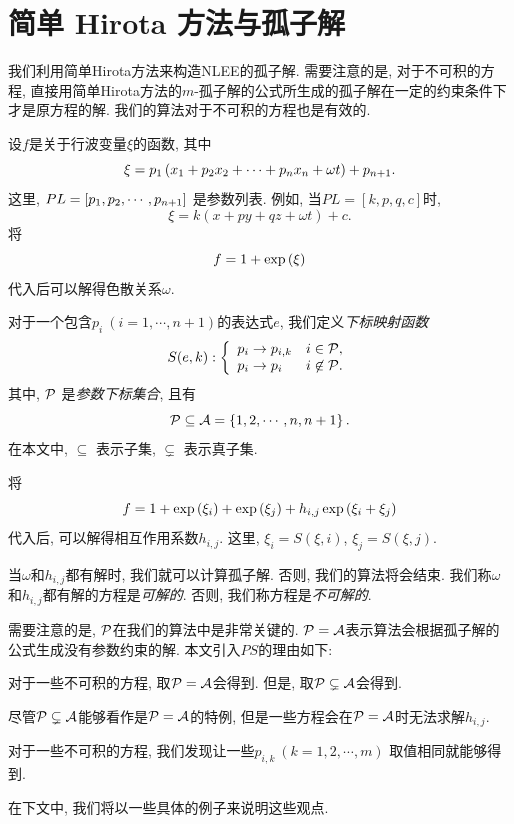 \section{简单 Hirota 方法与孤子解}

我们利用简单Hirota方法来构造NLEE的孤子解. 需要注意的是, 对于不可积的方程, 直接用简单Hirota方法的$m$-孤子解的公式所生成的孤子解在一定的约束条件下才是原方程的解. 我们的算法对于不可积的方程也是有效的. 

设$f$是关于行波变量$\xi$的函数, 其中
\begin{equation}
    \xi=p_1\left(x_1+p_2x_2+\cdots+p_nx_n+\omega t\right)+p_{n+1}. \label{tw}
\end{equation}
这里, $PL=\left[p_1,p_2,\cdots,p_{n+1}\right]$ 是参数列表. 例如, 当$PL=[k,p,q,c]$时, 
\begin{equation}
    \xi=k(x+py+qz+\omega t)+c.
\end{equation}
将
\begin{equation}
    f=1+\exp\left(\xi\right) \label{1-soliton}
\end{equation}
代入后可以解得色散关系$\omega$. 

对于一个包含$p_i~(i=1,\cdots,n+1)$的表达式$e$, 我们定义\emph{下标映射函数}
\begin{equation}
    S(e,k): \left\{\begin{array}{ll}
        p_i \rightarrow p_{i,k} & i \in \mathcal{P}, \\ 
        p_i \rightarrow p_i & i \not\in \mathcal{P}.
    \end{array}\right.
\end{equation}
其中, $\mathcal{P}$ 是\emph{参数下标集合}, 且有 
\begin{equation}
    \mathcal{P}\subseteq  \mathcal{A}=\left\{1,2,\cdots,n,n+1\right\}.
\end{equation}
在本文中, $\subseteq$ 表示子集, $\subsetneq$ 表示真子集. 

将
\begin{equation}
    f=1+\exp\left(\xi_i\right)+\exp\left(\xi_j\right)+h_{i,j}\exp\left(\xi_i+\xi_j\right) \label{hij}
\end{equation}
代入后, 可以解得相互作用系数$h_{i,j}$. 这里, $\xi_i=S(\xi,i)$, $\xi_j=S(\xi,j)$.

当$\omega$和$h_{i,j}$都有解时, 我们就可以计算孤子解. 否则, 我们的算法将会结束. 我们称$\omega$和$h_{i,j}$都有解的方程是\emph{可解的}. 否则, 我们称方程是\emph{不可解的}.

需要注意的是, $\mathcal{P}$在我们的算法中是非常关键的. $\mathcal{P}= \mathcal{A}$表示算法会根据孤子解的公式生成没有参数约束的解. 本文引入$PS$的理由如下: 
\begin{compactenum}[1. ]
\item 对于一些不可积的方程, 取$\mathcal{P}= \mathcal{A}$会得到\FalseSol{}. 但是, 取$\mathcal{P}\subsetneq  \mathcal{A}$会得到\TrueSol{}.
\item 尽管$\mathcal{P}\subsetneq  \mathcal{A}$能够看作是$\mathcal{P}= \mathcal{A}$的特例, 但是一些方程会在$\mathcal{P}= \mathcal{A}$时无法求解$h_{i,j}$.
\item 对于一些不可积的方程, 我们发现让一些$p_{i,k}~(k=1,2,\cdots,m)$ 取值相同就能够得到\TrueSol{}.
\end{compactenum}
在下文中, 我们将以一些具体的例子来说明这些观点. 

